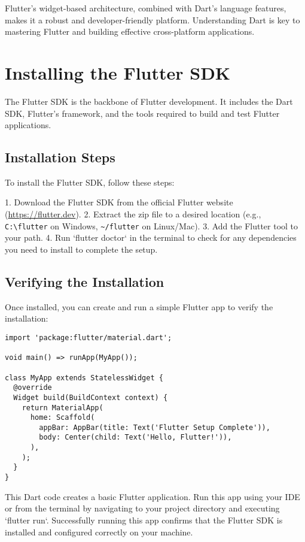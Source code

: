 \documentclass{book}
\begin{document}
Flutter's widget-based architecture, combined with Dart's language features, makes it a robust and developer-friendly platform. Understanding Dart is key to mastering Flutter and building effective cross-platform applications.

\chapter{Installing the Flutter SDK}

The Flutter SDK is the backbone of Flutter development. It includes the Dart SDK, Flutter's framework, and the tools required to build and test Flutter applications.

\section{Installation Steps}
To install the Flutter SDK, follow these steps:

1. Download the Flutter SDK from the official Flutter website (\url{https://flutter.dev}).
2. Extract the zip file to a desired location (e.g., \texttt{C:\textbackslash flutter} on Windows, \texttt{\textasciitilde/flutter} on Linux/Mac).
3. Add the Flutter tool to your path.
4. Run `flutter doctor` in the terminal to check for any dependencies you need to install to complete the setup.

\section{Verifying the Installation}
Once installed, you can create and run a simple Flutter app to verify the installation:

\begin{lstlisting}[style=dartstyle]
import 'package:flutter/material.dart';

void main() => runApp(MyApp());

class MyApp extends StatelessWidget {
  @override
  Widget build(BuildContext context) {
    return MaterialApp(
      home: Scaffold(
        appBar: AppBar(title: Text('Flutter Setup Complete')),
        body: Center(child: Text('Hello, Flutter!')),
      ),
    );
  }
}
\end{lstlisting}

This Dart code creates a basic Flutter application. Run this app using your IDE or from the terminal by navigating to your project directory and executing `flutter run`. Successfully running this app confirms that the Flutter SDK is installed and configured correctly on your machine.
\end{document}
